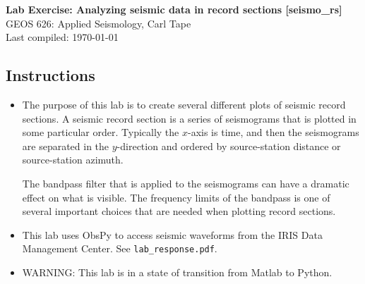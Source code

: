 \documentclass[11pt,titlepage,fleqn]{article}
\begin{document}

\begin{spacing}{1.2}
\centering
{\large \bf Lab Exercise: Analyzing seismic data in record sections [seismo\_rs]} \\
GEOS 626: Applied Seismology, Carl Tape \\
Last compiled: \today
\end{spacing}


\subsection*{Instructions}

\begin{itemize}
\item The purpose of this lab is to create several different plots of seismic record sections. A seismic record section is a series of seismograms that is plotted in some particular order. Typically the $x$-axis is time, and then the seismograms are separated in the $y$-direction and ordered by source-station distance or source-station azimuth.

The bandpass filter that is applied to the seismograms can have a dramatic effect on what is visible. The frequency limits of the bandpass is one of several important choices that are needed when plotting record sections.

\item This lab uses ObsPy to access seismic waveforms from the IRIS Data Management Center. See {\tt lab\_response.pdf}.

\item WARNING: This lab is in a state of transition from Matlab to Python.





\end{itemize}
\end{document}
